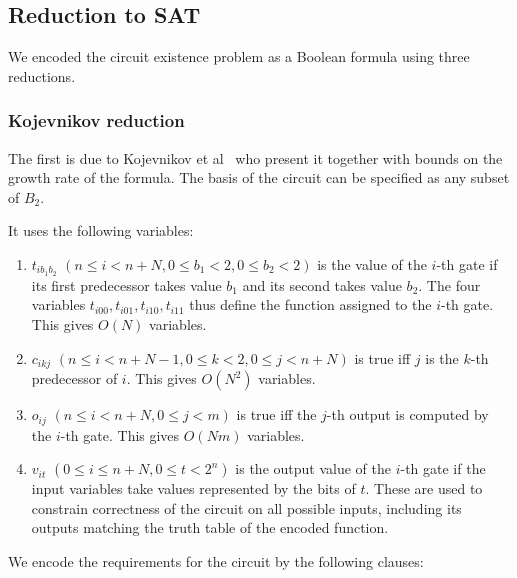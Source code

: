 \documentclass{article}
\begin{document}
\subsection{Reduction to SAT}

We encoded the circuit existence problem as a Boolean formula using three reductions.

\subsubsection{Kojevnikov reduction}

The first is due to Kojevnikov et al~\cite{kulikov} who present it together with bounds on the growth rate of the formula. The basis of the circuit can be specified as any subset of \(B_2\).

It uses the following variables:

\begin{enumerate}

  \item $t_{ib_1b_2}$ $(n \leq i < n + N, 0 \leq b_1 < 2, 0 \leq b_2 < 2)$ is the value of the $i$-th gate if its first predecessor takes value $b_1$ and its second takes value $b_2$. The four variables $t_{i00}, t_{i01}, t_{i10}, t_{i11}$ thus define the function assigned to the $i$-th gate. This gives $O(N)$ variables.
  \item $c_{ikj}$ $(n \leq i < n + N - 1, 0 \leq k < 2, 0 \leq j < n + N)$ is true iff $j$ is the $k$-th predecessor of $i$. This gives $O(N^2)$ variables.
  \item $o_{ij}$ $(n \leq i < n + N, 0 \leq j < m)$ is true iff the $j$-th output is computed by the $i$-th gate. This gives $O(Nm)$ variables.
  \item $v_{it}$ $(0 \leq i \leq n + N, 0 \leq t < 2^n)$ is the output value of the $i$-th gate if the input variables take values represented by the bits of $t$. These are used to constrain correctness of the circuit on all possible inputs, including its outputs matching the truth table of the encoded function.

\end{enumerate}

We encode the requirements for the circuit by the following clauses:
\end{document}
